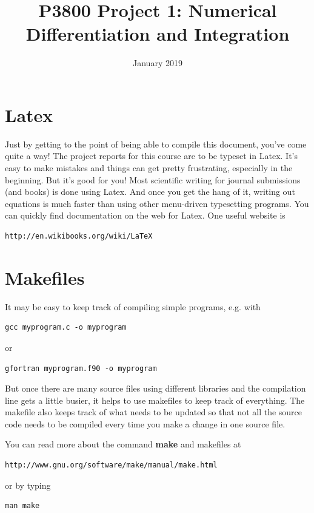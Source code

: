 \documentclass{article}
\title{P3800 Project 1: Numerical Differentiation and Integration}
\date{January 2019}
\begin{document}
   \maketitle


\section{Latex}

Just by getting to the point of being able to compile this document, you've come 
quite a way!  The project reports for this course are to be
typeset in Latex.  It's easy to make mistakes and things can get pretty
frustrating, especially in the beginning.  But it's good for you!
Most scientific writing for journal submissions (and books) is done using Latex.
And once you get the hang of it, writing out equations is much faster
than using other menu-driven typesetting programs.  You can quickly
find documentation on the web for Latex.  One useful website is

\begin{verbatim}
http://en.wikibooks.org/wiki/LaTeX
\end{verbatim}

\section{Makefiles}

It may be easy to keep track of compiling simple programs, e.g. with
\begin{verbatim}
gcc myprogram.c -o myprogram
\end{verbatim}

or

\begin{verbatim}
gfortran myprogram.f90 -o myprogram
\end{verbatim}
But once there are many source files using different libraries and the compilation
line gets a little busier, it helps to use makefiles to keep track of everything.
The makefile also keeps track of what needs to be updated so that not all the source
code needs to be compiled every time you make a change in one source file.

You can read more about the command {\bf make} and makefiles at
\begin{verbatim}
http://www.gnu.org/software/make/manual/make.html
\end{verbatim}

or by typing
\begin{verbatim}
man make
\end{verbatim}
\end{document}
